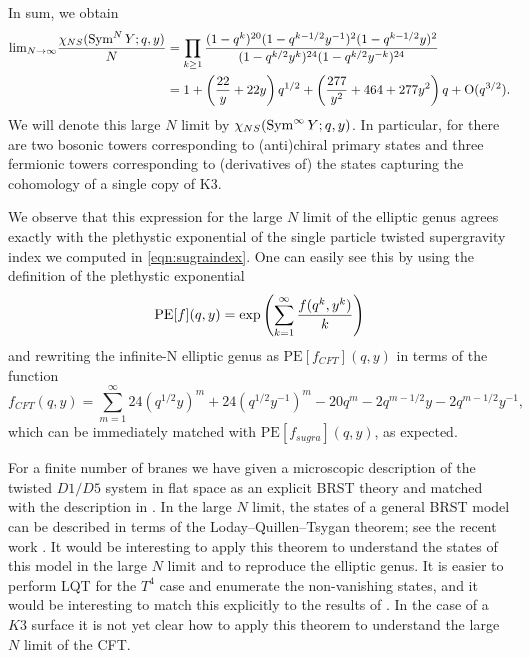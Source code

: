 \documentclass[../main.tex]{subfiles}
\begin{document}
In sum, we obtain
\begin{align}
{\rm lim}_{N \rightarrow \infty}{\chi_{NS}(\operatorname{Sym}^{N} Y; q, y) \over N} &= \prod_{k \geq 1}{(1 - q^k)^{20}(1 - q^{k-1/2}y^{-1})^2(1 - q^{k-1/2}y)^2 \over (1 - q^{k/2}y^k)^{24}(1 - q^{k/2}y^{-k})^{24}} \\
&= 1 + \left({22 \over y} + 22 y \right)q^{1/2} + \left({277 \over y^2} + 464 + 277 y^2 \right)q + \text{O}(q^{3/2}).
\end{align} 
We will denote this large $N$ limit by $\chi_{NS}(\operatorname{Sym}^\infty Y ; q,y)$. 
In particular, for there are two bosonic towers corresponding to (anti)chiral primary states and three fermionic towers corresponding to (derivatives of) the states capturing the cohomology of a single copy of K3.

We observe that this expression for the large $N$ limit of the elliptic genus agrees exactly with the plethystic exponential of the single particle twisted supergravity index we computed in \eqref{eqn:sugraindex}. One can easily see this by using the definition of the plethystic exponential 
\begin{equation}
\textrm{PE}[f](q, y) = \textrm{exp}\left(\sum_{k=1}^{\infty}{f(q^k, y^k) \over k}\right)
\end{equation} and rewriting the infinite-N elliptic genus as $\textrm{PE}[f_{CFT}](q, y)$ in terms of the function
\begin{equation}
f_{CFT}(q, y) = \sum_{m=1}^{\infty} 24 (q^{1/2} y)^m + 24 (q^{1/2}y^{-1})^m -20 q^m - 2 q^{m-1/2} y - 2 q^{m-1/2} y^{-1} ,
\end{equation} which can be immediately matched with $\textrm{PE}[f_{sugra}](q, y)$, as expected.

For a finite number of branes we have given a microscopic description of the twisted $D1/D5$ system in flat space as an explicit BRST theory and matched with the description in \cite{Davidetal}. 
In the large $N$ limit, the states of a general BRST model can be described in terms of the Loday--Quillen--Tsygan theorem; see the recent work \cite{costello2015quantization,CostelloGaiotto,Ginot:2021thu,Budzik:2023xbr}.
It would be interesting to apply this theorem to understand the states of this model in the large $N$ limit and to reproduce the elliptic genus. It is easier to perform LQT for the $T^4$ case and enumerate the non-vanishing states, and it would be interesting to match this explicitly to the results of \cite{CP}. 
In the case of a $K3$ surface it is not yet clear how to apply this theorem to understand the large $N$ limit of the CFT.

\end{document}
